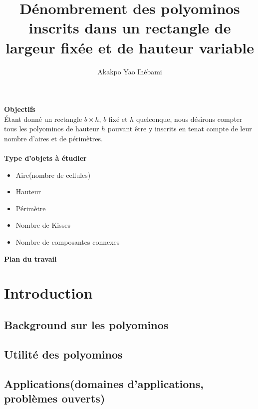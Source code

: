 \documentclass[12pt]{memoireuqam1.3}
\begin{document}
\title{Dénombrement des polyominos inscrits dans un rectangle de largeur fixée et de hauteur variable}
\author{Akakpo Yao Ihébami}
\uqammemoire %
{}


\thispagestyle{empty}        %
\maketitle

\textbf{Objectifs}\\
Étant donné un rectangle $b\times h$, $b$ fixé et $h$ quelconque,  nous désirons compter tous les polyominos de hauteur $h$ pouvant être y inscrits en tenat compte de leur nombre d'aires et de périmètres.\\\\
\textbf{Type d’objets à étudier}\\
\begin{itemize}
\item Aire(nombre de cellules)
\item Hauteur
\item Périmètre
\item Nombre de Kisses
\item Nombre de composantes connexes
\end{itemize}

\textbf{Plan du travail}\\
\chapter{Introduction}
\section{Background sur les polyominos}
\section{Utilité des polyominos}
\section{Applications(domaines d'applications, problèmes ouverts)}
\end{document}
